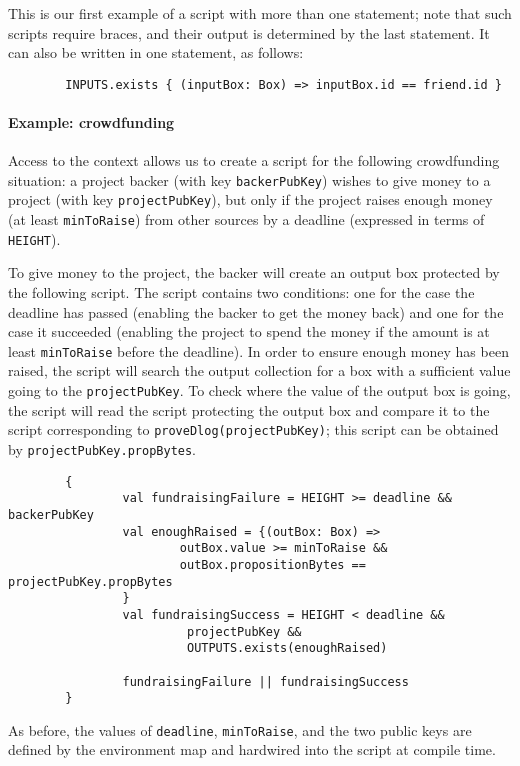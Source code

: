 \documentclass[11pt]{article}
\begin{document}
This is our first example of a script with more than one statement; note that such scripts require braces, and their output is determined by the last statement.
It can also be written in one statement, as follows:
\begin{verbatim}
        INPUTS.exists { (inputBox: Box) => inputBox.id == friend.id }
\end{verbatim}


\paragraph{Example: crowdfunding}
Access to the context allows us to create a script for the following crowdfunding situation: a project backer (with key  \texttt{backerPubKey}) wishes to give money to a project (with key \texttt{projectPubKey}), but only if the project raises enough money (at least \texttt{minToRaise}) from other sources by a deadline (expressed in terms of \texttt{HEIGHT}). 

To give money to the project, the backer will create an output box protected by the following script. The script contains two conditions: one for the case the deadline has passed (enabling the backer to get the money back) and one for the case it succeeded (enabling the project to spend the money if the amount is at least \texttt{minToRaise} before the deadline).  In order to ensure enough money has been raised, the script will search the output collection for a box with a sufficient value going to the \texttt{projectPubKey}. To check where the value of the output box is going, the script will read the script protecting the output box and compare it to the script corresponding to \texttt{proveDlog(projectPubKey)}; this script can be obtained by \texttt{projectPubKey.propBytes}.

\begin{verbatim}
        {
                val fundraisingFailure = HEIGHT >= deadline && backerPubKey
                val enoughRaised = {(outBox: Box) =>
                        outBox.value >= minToRaise && 
                        outBox.propositionBytes == projectPubKey.propBytes
                }
                val fundraisingSuccess = HEIGHT < deadline &&
                         projectPubKey &&  
                         OUTPUTS.exists(enoughRaised)
                 
                fundraisingFailure || fundraisingSuccess
        }
\end{verbatim}

As before, the values of \texttt{deadline}, \texttt{minToRaise}, and the two public keys are defined by the environment map and hardwired into the script at compile time. 
\end{document}
